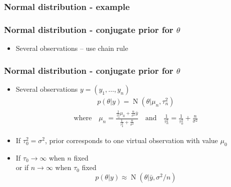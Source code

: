 \documentclass[english,t]{beamer}
\DeclareMathOperator{\N}{N}
\begin{document}
\begin{frame}
  \frametitle{Normal distribution - example}

  
\end{frame}

\begin{frame}
  \frametitle{Normal distribution - conjugate prior for $\theta$}

  \begin{itemize}
  \item Several observations -- use chain rule
  \end{itemize}

\end{frame}

\begin{frame}

  \frametitle{Normal distribution - conjugate prior for $\theta$}

  \begin{itemize}
  \item Several observations $y=(y_1,\ldots,y_n)$
    \begin{align*}
      p(\theta|y) = \N(\theta|\mu_n,\tau_n^2)
    \end{align*}
    \vskip -6mm
    \begin{align*}
      \text{where} \quad
      \mu_n=\frac{\frac{1}{\tau_0^2}\mu_0+\frac{n}{\sigma^2}\bar{y}}{\frac{1}{\tau_0^2}+\frac{n}{\sigma^2}} \quad
      \text{and} \quad \frac{1}{\tau_n^2} = \frac{1}{\tau_0^2}+\frac{n}{\sigma^2}
    \end{align*}
  \item If $\tau_0^2=\sigma^2$, prior corresponds to one virtual observation with value $\mu_0$
    \pause
    \item If $\tau_0\rightarrow\infty$ when $n$ fixed\\
      or if $n\rightarrow\infty$ when $\tau_0$ fixed
      \begin{equation*}
        p(\theta|y) \approx \N(\theta|\bar{y},\sigma^2/n)
      \end{equation*}
  \end{itemize}

\end{frame}
\end{document}
